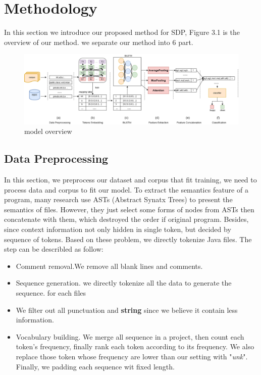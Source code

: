 \chapter{Methodology}

In this section we introduce our proposed method for SDP, Figure 3.1 is the overview of our method. we separate our method into 6 part. 

\begin{figure}
    \centering
    \includegraphics[width=\textwidth,height=0.2\textheight]{pic/model_overview.png}
    \caption{model overview}
    \label{fig:my_label}
\end{figure}

\section{Data Preprocessing}
In this section, we preprocess our dataset and corpus that fit training, we need to process data and corpus to fit our model. To extract the semantics feature of a program, many research use ASTs (Abstract Synatx Trees) \cite{}to present the semantics of files. However, they just select some forms of nodes from ASTs then concatenate with them, which destroyed the order if original program. Besides, since context information not only hidden in single token, but decided by sequence of tokens. Based on these problem, we directly tokenize Java files. The step can be describled as follow:
\begin{itemize}
    \item Comment removal.We remove all blank lines and comments.
    \item Sequence generation. we directly tokenize all the data to generate the sequence. for each files
    \item We filter out all punctuation and \textbf{string} since we believe it contain less information.
    \item Vocabulary building. We merge all sequence in a project, then count each token's frequency, finally rank each token according to its frequency. We also replace those token whose frequency are lower than our setting with "\textit{unk}". Finally, we padding each sequence wit fixed length.
\end{itemize}

